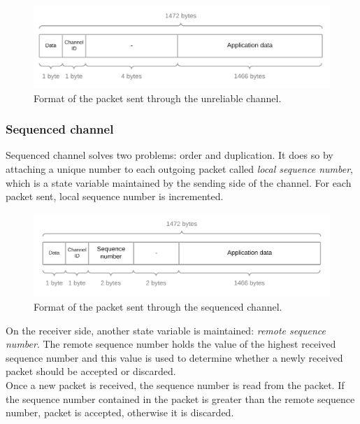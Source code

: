 \documentclass[times, utf8, diplomski]{fer}
\begin{document}
\begin{figure}[h!]
	\centering
	\includegraphics[scale=0.2]{Unreliable-packet-structure}
	\caption{Format of the packet sent through the unreliable channel.}
\end{figure}



\subsubsection{Sequenced channel}
Sequenced channel solves two problems: order and duplication. It does so by attaching a unique number to each outgoing packet called \textit{local sequence number}, which is a state variable maintained by the sending side of the channel. For each packet sent, local sequence number is incremented.

\begin{figure}[h!]
	\centering
	\includegraphics[scale=0.2]{Sequenced-packet-structure}
	\caption{Format of the packet sent through the sequenced channel.}
\end{figure}

On the receiver side, another state variable is maintained: \textit{remote sequence number}. The remote sequence number holds the value of the highest received sequence number and this value is used to determine whether a newly received packet should be accepted or discarded. \\

Once a new packet is received, the sequence number is read from the packet. If the sequence number contained in the packet is greater than the remote sequence number, packet is accepted, otherwise it is discarded. \\
\end{document}
